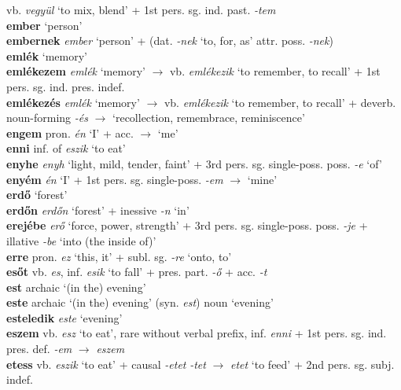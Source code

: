 \documentclass[11pt]{article}
\begin{document}
vb. \emph{vegyül} `to mix, blend' + 1st
pers. sg. ind. past. \emph{-tem} \\
\textbf{ember} `person' \\
\textbf{embernek} \emph{ember} `person' + (dat. \emph{-nek} `to,
for, as' \textbar\textbar{} attr. poss. \emph{-nek}) \\
\textbf{emlék} `memory' \\
\textbf{emlékezem} \emph{emlék} `memory' $\rightarrow$
vb. \emph{emlékezik} `to remember, to recall' + 1st
pers. sg. ind. pres. indef. \\
\textbf{emlékezés} \emph{emlék} `memory' $\rightarrow$
vb. \emph{emlékezik} `to remember, to recall' +
deverb. noun\hyp{}forming \emph{-és} $\rightarrow$ `recollection,
remembrace, reminiscence' \\
\textbf{engem} pron. \emph{én} `I' + acc. $\rightarrow$ `me' \\
\textbf{enni} inf. of \emph{eszik} `to eat' \\
\textbf{enyhe} \emph{enyh} `light, mild, tender, faint' + 3rd
pers. sg. single\hyp{}poss. poss. \emph{-e} `of' \\
\textbf{enyém} \emph{én} `I' + 1st
pers. sg. single\hyp{}poss. \emph{-em} $\rightarrow$ `mine' \\
\textbf{erdő} `forest' \\
\textbf{erdőn} \emph{erdőn} `forest' + inessive \emph{-n} `in' \\
\textbf{erejébe} \emph{erő} `force, power, strength' + 3rd
pers. sg. single\hyp{}poss. poss. \emph{-je} + illative \emph{-be}
`into (the inside of)' \\
\textbf{erre} pron. \emph{ez} `this, it' + subl. sg. \emph{-re} `onto,
to' \\
\textbf{esőt} vb. \emph{es}, inf. \emph{esik} `to fall' + pres. part. \emph{-ő} + acc. \emph{-t} \\
\textbf{est} archaic `(in the) evening' \\
\textbf{este} archaic  `(in the) evening'
(syn. \emph{est}) \textbar\textbar{} noun `evening' \\
\textbf{esteledik} \emph{este} `evening' \\
\textbf{eszem} vb. \emph{esz} `to eat', rare without verbal prefix,
inf. \emph{enni} + 1st pers. sg. ind. pres. def. \emph{-em}
  $\rightarrow$ \emph{eszem} \\
\textbf{etess} vb. \emph{eszik} `to eat' +
  causal \emph{-etet} \emph{-tet} $\rightarrow$ \emph{etet} `to feed'
  + 2nd pers. sg. subj. indef. \\
\end{document}
